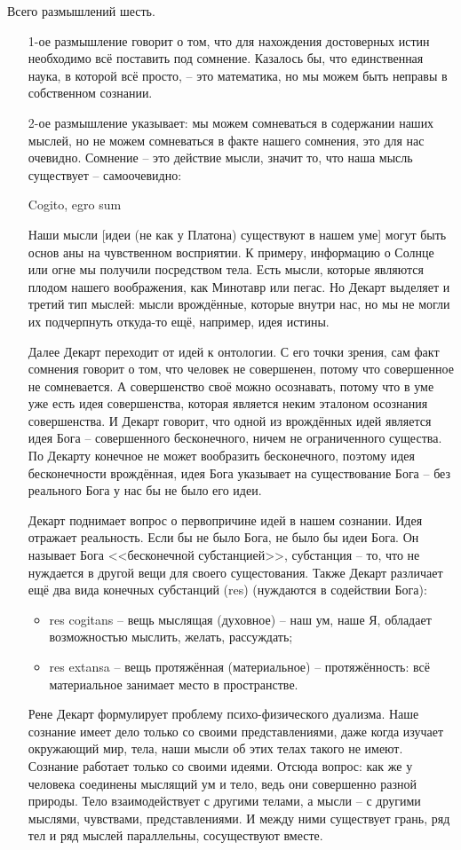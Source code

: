 \documentclass[a4paper, 12pt]{book} %
\begin{document}
Всего размышлений шесть.
\begin{itemize}
\item[1-ое размышление] говорит о том, что для нахождения достоверных истин необходимо всё поставить под сомнение. Казалось бы, что единственная наука, в которой всё просто, -- это математика, но мы можем быть неправы в собственном сознании.
\item[2-ое размышление] указывает: мы можем сомневаться в содержании наших мыслей, но не можем сомневаться в факте нашего сомнения, это для нас очевидно. Сомнение -- это действие мысли, значит то, что наша мысль существует -- самоочевидно:
\begin{center}
Cogito, egro sum
\end{center}
Наши мысли [идеи (не как у Платона) существуют в нашем уме] могут быть основ	аны на чувственном восприятии. К примеру, информацию о Солнце или огне мы получили посредством тела. Есть мысли, которые являются плодом нашего воображения, как Минотавр или пегас. Но Декарт выделяет и третий тип мыслей: мысли врождённые, которые внутри нас, но мы не могли их подчерпнуть откуда-то ещё, например, идея истины. 

Далее Декарт переходит от идей к онтологии. С его точки зрения, сам факт сомнения говорит о том, что человек не совершенен, потому что совершенное не сомневается. А совершенство своё можно осознавать, потому что в уме уже есть идея совершенства, которая является неким эталоном осознания совершенства. И Декарт говорит, что одной из врождённых идей является идея Бога -- совершенного бесконечного, ничем не ограниченного существа. По Декарту конечное не может вообразить бесконечного, поэтому идея бесконечности врождённая, идея Бога указывает на существование Бога -- без реального Бога у нас бы не было его идеи.

Декарт поднимает вопрос о первопричине идей в нашем сознании. Идея отражает реальность. Если бы не было Бога, не было бы идеи Бога. Он называет Бога <<бесконечной субстанцией>>, субстанция -- то, что не нуждается в другой вещи для своего сущестования. Также Декарт различает ещё два вида конечных субстанций (res) (нуждаются в содействии Бога):

\begin{itemize}
\item res cogitans -- вещь мыслящая (духовное) -- наш ум, наше Я, обладает возможностью мыслить, желать, рассуждать;
\item res extansa -- вещь протяжённая (материальное) -- протяжённость: всё материальное занимает место в пространстве.
\end{itemize} 

Рене Декарт формулирует проблему психо-физического дуализма. Наше сознание имеет дело только со своими представлениями, даже когда изучает окружающий мир, тела, наши мысли об этих телах такого не имеют. Сознание работает только со своими идеями. Отсюда вопрос: как же у человека соединены мыслящий ум и тело, ведь они совершенно разной природы. Тело взаимодействует с другими телами, а мысли -- с другими мыслями, чувствами, представлениями. И между ними существует грань, ряд тел и ряд мыслей параллельны, сосуществуют вместе.
\end{itemize}
\end{document}
